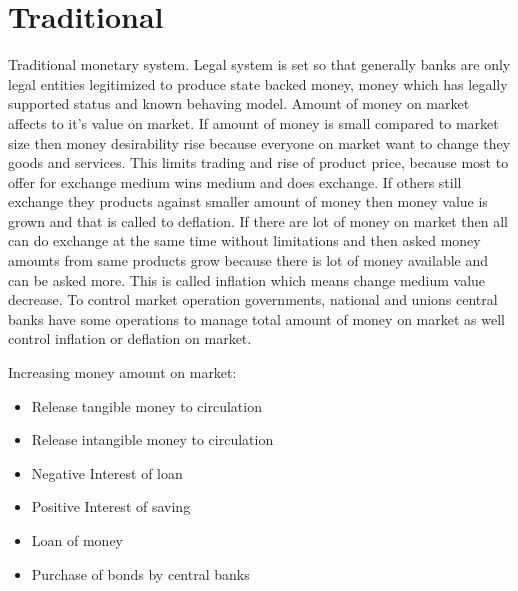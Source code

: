 \section{Traditional}
Traditional monetary system. Legal system is set so that generally banks are
only legal entities legitimized to produce state backed money, money which has
legally supported status and known behaving model. Amount of money on market
affects to it's value on market. If amount of money is small compared to
market size then money desirability rise because everyone on market want to
change they goods and services. This limits trading and rise of product price,
because most to offer for exchange medium wins medium and does exchange. If
others still exchange they products against smaller amount of money then money
value is grown and that is called to deflation. If there are lot of money on
market then all can do exchange at the same time without limitations and then
asked money amounts from same products grow because there is lot of money
available and can be asked more. This is called inflation which means change
medium value decrease. To control market operation governments, national and
unions central banks have some operations to manage total amount of money on
market as well control inflation or deflation on market.
\newline

Increasing money amount on market:
\begin{itemize}
\item Release tangible money to circulation
\item Release intangible money to circulation
\item Negative Interest of loan
\item Positive Interest of saving
\item Loan of money
\item Purchase of bonds by central banks
\end{itemize}

